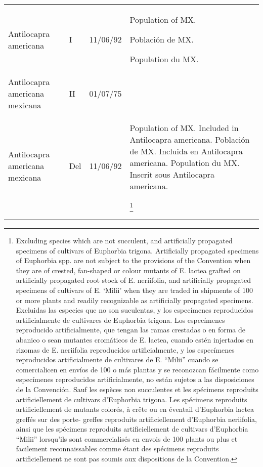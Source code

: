 \begin{longtable}{l l l l}
Antilocapra americana & I & 11/06/92 & 
Population of MX.

Población de MX.

Population du MX.

 \\
  Antilocapra americana mexicana & II & 01/07/75 &
 \\
  Antilocapra americana mexicana & Del & 11/06/92 &
Population of MX. Included in Antilocapra americana.
\newline
Población de MX. Incluida en Antilocapra americana.
\newline
Population du MX. Inscrit sous Antilocapra americana.

\footnote{Excluding species which are not succulent, and artificially
propagated specimens of cultivars of Euphorbia trigona.
Artificially propagated specimens of Euphorbia spp. are not
subject to the provisions of the Convention when they are of
crested, fan-shaped or colour mutants of E. lactea grafted on
artificially propagated root stock of E. neriifolia, and artificially
propagated specimens of cultivars of E. ‘Milii’ when they are
traded in shipments of 100 or more plants and readily
recognizable as artificially propagated specimens.
Excluidas las especies que no son suculentas, y los
especímenes reproducidos artificialmente de cultivares de
Euphorbia trigona. Los especímenes reproducido
artificialmente, que tengan las ramas crestadas o en forma de
abanico o sean mutantes cromáticos de E. lactea, cuando
estén injertados en rizomas de E. neriifolia reproducidos
artificialmente, y los especímenes reproducidos artificialmente
de cultivares de E. “Milii” cuando se comercialicen en envíos
de 100 o más plantas y se reconozcan fácilmente como
especímenes reproducidos artificialmente, no están sujetos a
las disposiciones de la Convención.
Sauf les espèces non succulentes et les spécimens reproduits
artificiellement de cultivars d'Euphorbia trigona. Les
spécimens reproduits artificiellement de mutants colorés, à
crête ou en éventail d’Euphorbia lactea greffés sur des porte-
greffes reproduits artificiellement d'Euphorbia neriifolia, ainsi
que les spécimens reproduits artificiellement de cultivars
d’Euphorbia “Milii” lorsqu’ils sont commercialisés en envois de
100 plants ou plus et facilement reconnaissables comme étant
des spécimens reproduits artificiellement ne sont pas soumis
aux dispositions de la Convention.
}
 \\

\end{longtable}

